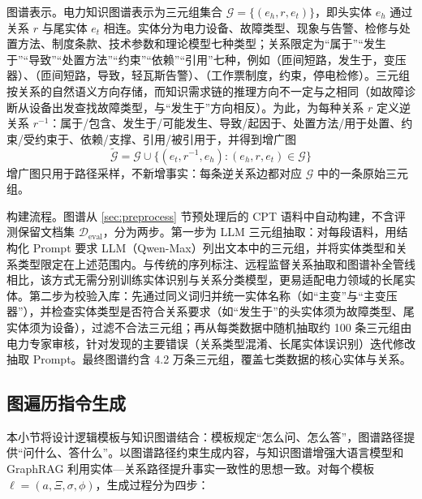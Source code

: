 \documentclass[fontset=fandol,type=master,campus=shenzhen,etitleauto=true]{hithesisbook}
\begin{document}
图谱表示。电力知识图谱表示为三元组集合 $\mathcal{G} = \{(e_h, r, e_t)\}$，即头实体 $e_h$ 通过关系 $r$ 与尾实体 $e_t$ 相连。实体分为电力设备、故障类型、现象与告警、检修与处置方法、制度条款、技术参数和理论模型七种类型；关系限定为“属于”“发生于”“导致”“处置方法”“约束”“依赖”“引用”七种，例如（匝间短路，发生于，变压器）、（匝间短路，导致，轻瓦斯告警）、（工作票制度，约束，停电检修）。三元组按关系的自然语义方向存储，而知识需求链的推理方向不一定与之相同（如故障诊断从设备出发查找故障类型，与“发生于”方向相反）。为此，为每种关系 $r$ 定义逆关系 $r^{-1}$：属于/包含、发生于/可能发生、导致/起因于、处置方法/用于处置、约束/受约束于、依赖/支撑、引用/被引用于，并得到增广图
\begin{equation}\label{eq:kg-aug}
\tilde{\mathcal{G}} = \mathcal{G} \cup \bigl\{ (e_t, r^{-1}, e_h) : (e_h, r, e_t) \in \mathcal{G} \bigr\}
\end{equation}
增广图只用于路径采样，不新增事实：每条逆关系边都对应 $\mathcal{G}$ 中的一条原始三元组。

构建流程。图谱从 \ref{sec:preprocess} 节预处理后的 CPT 语料中自动构建，不含评测保留文档集 $\mathcal{D}_{\text{eval}}$，分为两步。第一步为 LLM 三元组抽取：对每段语料，用结构化 Prompt 要求 LLM（Qwen-Max）列出文本中的三元组，并将实体类型和关系类型限定在上述范围内。与传统的序列标注、远程监督关系抽取和图谱补全管线\cite{ref70,ref71,ref72,ref73,ref74}相比，该方式无需分别训练实体识别与关系分类模型，更易适配电力领域的长尾实体。第二步为校验入库：先通过同义词归并统一实体名称（如“主变”与“主变压器”），并检查实体类型是否符合关系要求（如“发生于”的头实体须为故障类型、尾实体须为设备），过滤不合法三元组；再从每类数据中随机抽取约 100 条三元组由电力专家审核，针对发现的主要错误（关系类型混淆、长尾实体误识别）迭代修改抽取 Prompt。最终图谱约含 4.2 万条三元组，覆盖七类数据的核心实体与关系。

\subsection{图遍历指令生成}\label{ux903bux8f91ux6a21ux677fux9a71ux52a8ux7684ux56feux904dux5386ux751fux6210}

本小节将设计逻辑模板与知识图谱结合：模板规定“怎么问、怎么答”，图谱路径提供“问什么、答什么”。以图谱路径约束生成内容，与知识图谱增强大语言模型和 GraphRAG 利用实体—关系路径提升事实一致性的思想一致\cite{ref15,ref16}。对每个模板 $\ell = (a, \Xi, \sigma, \phi)$，生成过程分为四步：
\end{document}
